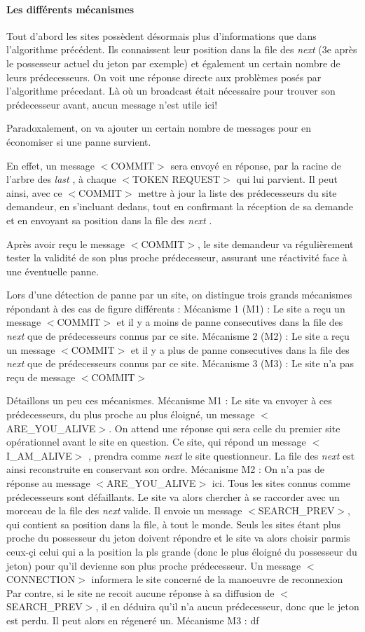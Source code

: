 \documentclass[a4paper,12pt]{article}
\newcommand{\last}{\textit{last} }
\newcommand{\next}{\textit{next} }
\begin{document}
\paragraph{Les différents mécanismes}
Tout d'abord les sites possèdent désormais plus d'informations que dans l'algorithme précédent. Ils connaissent leur position dans la file des \next (3e après le possesseur actuel du jeton par exemple) et également un certain nombre de leurs prédecesseurs. On voit une réponse directe aux problèmes posés par l'algorithme précedant. Là où un broadcast était nécessaire pour trouver son prédecesseur avant, aucun message n'est utile ici! 

Paradoxalement, on va ajouter un certain nombre de messages pour en économiser si une panne survient.

En effet, un message $<$COMMIT$>$ sera envoyé en réponse, par la racine de l'arbre des \last, à chaque $<$TOKEN REQUEST$>$ qui lui parvient. Il peut ainsi, avec ce $<$COMMIT$>$ mettre à jour la liste des prédecesseurs du site demandeur, en s'incluant dedans, tout en confirmant la réception de sa demande et en envoyant sa position dans la file des \next.

Après avoir reçu le message $<$COMMIT$>$, le site demandeur va régulièrement tester la validité de son plus proche prédecesseur, assurant une réactivité face à une éventuelle panne.


Lors d'une détection de panne par un site, on distingue trois grands mécanismes répondant à des cas de figure différents : 
Mécanisme 1 (M1) : Le site a reçu un message $<$COMMIT$>$ et il y a moins de panne consecutives dans la file des \next que de prédecesseurs connus par ce site. 
Mécanisme 2 (M2) : Le site a reçu un message $<$COMMIT$>$ et il y a plus de panne consecutives dans la file des \next que de prédecesseurs connus par ce site.
Mécanisme 3 (M3) : Le site n'a pas reçu de message $<$COMMIT$>$

Détaillons un peu ces mécanismes.
Mécanisme M1 : Le site va envoyer à ces prédecesseurs, du plus proche au plus éloigné, un message $<$ARE\_YOU\_ALIVE$>$. On attend une réponse qui sera celle du premier site opérationnel avant le site en question. Ce site, qui répond un message $<$I\_AM\_ALIVE$>$ , prendra comme \next le site questionneur. La file des \next est ainsi reconstruite en conservant son ordre.
Mécanisme M2 : On n'a pas de réponse au message $<$ARE\_YOU\_ALIVE$>$ ici. Tous les sites connus comme prédecesseurs sont défaillants. Le site va alors chercher à se raccorder avec un morceau de la file des \next valide. Il envoie un message $<$SEARCH\_PREV$>$, qui contient sa position dans la file, à tout le monde.
Seuls les sites étant plus proche du possesseur du jeton doivent répondre et le site va alors choisir parmis ceux-çi celui qui a la position la pls grande (donc le plus éloigné du possesseur du jeton) pour qu'il devienne son plus proche prédecesseur. Un message $<$CONNECTION$>$ informera le site concerné de la manoeuvre de reconnexion
Par contre, si le site ne recoit aucune réponse à sa diffusion de $<$SEARCH\_PREV$>$, il en déduira qu'il n'a aucun prédecesseur, donc que le jeton est perdu. Il peut alors en régeneré un.
Mécanisme M3 : df
\end{document}
